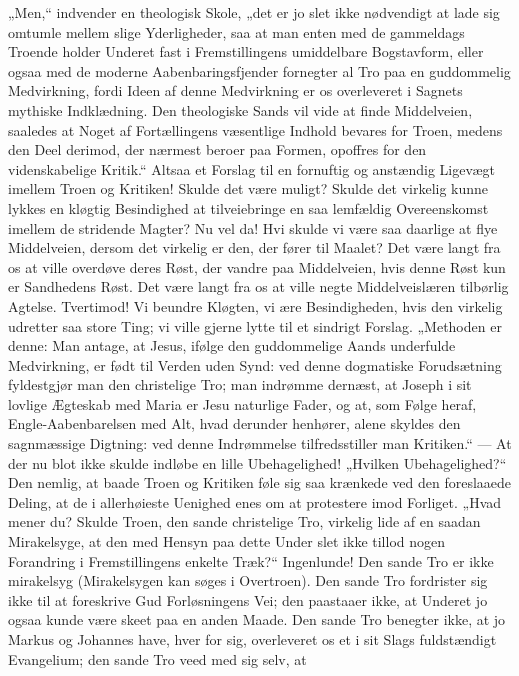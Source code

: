 \documentclass[12pt,a4paper]{book}
\begin{document}
„Men,“ indvender en theologisk Skole, „det er jo slet ikke nødvendigt at lade
sig omtumle mellem slige Yderligheder, saa at man enten med de gammeldags
Troende holder Underet fast i Fremstillingens umiddelbare Bogstavform, eller
ogsaa med de moderne Aabenbaringsfjender fornegter al Tro paa en guddommelig
Medvirkning, fordi Ideen af denne Medvirkning er os overleveret i Sagnets
mythiske Indklædning. Den theologiske Sands vil vide at finde Middelveien,
saaledes at Noget af Fortællingens væsentlige Indhold bevares for Troen,
medens den Deel derimod, der nærmest beroer paa Formen, opoffres for den
videnskabelige Kritik.“
Altsaa et Forslag til en fornuftig og anstændig Ligevægt imellem Troen og
Kritiken! Skulde det være muligt? Skulde det virkelig kunne lykkes en kløgtig
Besindighed at tilveiebringe en saa lemfældig Overeenskomst imellem de
stridende Magter? Nu vel da! Hvi skulde vi være saa daarlige at flye
Middelveien, dersom det virkelig er den, der fører til Maalet? Det være langt
fra os at ville overdøve deres Røst, der vandre paa Middelveien, hvis denne
Røst kun er Sandhedens Røst. Det være langt fra os at ville negte
Middelveislæren tilbørlig Agtelse. Tvertimod! Vi beundre Kløgten, vi ære
Besindigheden, hvis den virkelig udretter saa store Ting; vi ville gjerne
lytte til et sindrigt Forslag. „Methoden er denne: Man antage, at Jesus,
ifølge den guddommelige Aands underfulde Medvirkning, er født til Verden uden
Synd: ved denne dogmatiske Forudsætning fyldestgjør man den christelige Tro;
man indrømme dernæst, at Joseph i sit lovlige Ægteskab med Maria er Jesu
naturlige Fader, og at, som Følge heraf, Engle-Aabenbarelsen med Alt, hvad
derunder henhører, alene skyldes den sagnmæssige Digtning: ved denne
Indrømmelse tilfredsstiller man Kritiken.“ --- At der nu blot ikke skulde
indløbe en lille Ubehagelighed! „Hvilken Ubehagelighed?“ Den nemlig, at baade
Troen og Kritiken føle sig saa krænkede ved den foreslaaede Deling, at de i
allerhøieste Uenighed enes om at protestere imod Forliget. „Hvad mener du?
Skulde Troen, den sande christelige Tro, virkelig lide af en saadan
Mirakelsyge, at den med Hensyn paa dette Under slet ikke tillod nogen
Forandring i Fremstillingens enkelte Træk?“ Ingenlunde! Den sande Tro er ikke
mirakelsyg (Mirakelsygen kan søges i Overtroen). Den sande Tro fordrister sig
ikke til at foreskrive Gud Forløsningens Vei; den paastaaer ikke, at Underet
jo ogsaa kunde være skeet paa en anden Maade. Den sande Tro benegter ikke, at
jo Markus og Johannes have, hver for sig, overleveret os
et i sit Slags fuldstændigt Evangelium; den sande Tro veed med sig selv, at
\end{document}
